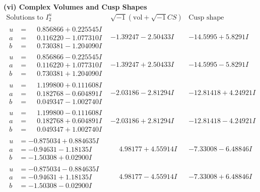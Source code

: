 \documentclass[1p]{elsarticle_modified}
\theoremstyle{definition}
\newcommand{\I}{\sqrt{-1}}
\begin{document}
\newpage\flushleft \textbf{(vi) Complex Volumes and Cusp Shapes}
$$\begin{array}{c|c|c}  
\text{Solutions to }I^u_{2}& \I (\text{vol} + \sqrt{-1}CS) & \text{Cusp shape}\\
 \hline 
\begin{aligned}
u &= \phantom{-}0.856866 + 0.225545 I \\
a &= \phantom{-}0.116220 - 1.077310 I \\
b &= \phantom{-}0.730381 - 1.204090 I\end{aligned}
 & -1.39247 - 2.50433 I & -14.5995 + 5.8291 I \\ \hline\begin{aligned}
u &= \phantom{-}0.856866 - 0.225545 I \\
a &= \phantom{-}0.116220 + 1.077310 I \\
b &= \phantom{-}0.730381 + 1.204090 I\end{aligned}
 & -1.39247 + 2.50433 I & -14.5995 - 5.8291 I \\ \hline\begin{aligned}
u &= \phantom{-}1.199800 + 0.111608 I \\
a &= \phantom{-}0.182768 - 0.604891 I \\
b &= \phantom{-}0.049347 - 1.002740 I\end{aligned}
 & -2.03186 - 2.81294 I & -12.81418 + 4.24921 I \\ \hline\begin{aligned}
u &= \phantom{-}1.199800 - 0.111608 I \\
a &= \phantom{-}0.182768 + 0.604891 I \\
b &= \phantom{-}0.049347 + 1.002740 I\end{aligned}
 & -2.03186 + 2.81294 I & -12.81418 - 4.24921 I \\ \hline\begin{aligned}
u &= -0.875034 + 0.884635 I \\
a &= -0.94631 - 1.18135 I \\
b &= -1.50308 + 0.02900 I\end{aligned}
 & \phantom{-}4.98177 + 4.55914 I & -7.33008 - 6.48846 I \\ \hline\begin{aligned}
u &= -0.875034 - 0.884635 I \\
a &= -0.94631 + 1.18135 I \\
b &= -1.50308 - 0.02900 I\end{aligned}
 & \phantom{-}4.98177 - 4.55914 I & -7.33008 + 6.48846 I \\ \hline\begin{aligned}

\end{aligned}
\end{array}$$
\end{document}
